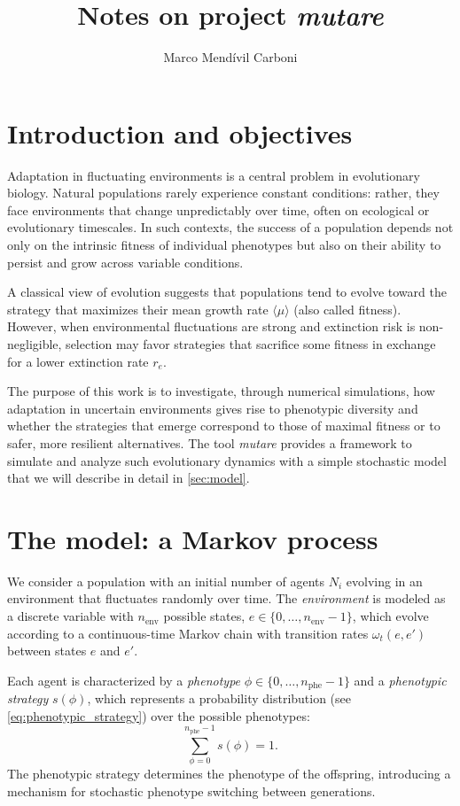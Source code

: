 \documentclass[a4paper,10pt,twocolumn]{article}
\title{Notes on project \emph{mutare}}
\author{Marco Mendívil Carboni}
\begin{document}
\maketitle

\section{Introduction and objectives} \label{sec:introduction}

Adaptation in fluctuating environments is a central problem in evolutionary biology. Natural populations rarely experience constant conditions: rather, they face environments that change unpredictably over time, often on ecological or evolutionary timescales. In such contexts, the success of a population depends not only on the intrinsic fitness of individual phenotypes but also on their ability to persist and grow across variable conditions.

A classical view of evolution suggests that populations tend to evolve toward the strategy that maximizes their mean growth rate $\langle\mu\rangle$ (also called fitness). However, when environmental fluctuations are strong and extinction risk is non-negligible, selection may favor strategies that sacrifice some fitness in exchange for a lower extinction rate $r_e$.

The purpose of this work is to investigate, through numerical simulations, how adaptation in uncertain environments gives rise to phenotypic diversity and whether the strategies that emerge correspond to those of maximal fitness or to safer, more resilient alternatives. The tool \emph{mutare} provides a framework to simulate and analyze such evolutionary dynamics with a simple stochastic model that we will describe in detail in \autoref{sec:model}.

\section{The model: a Markov process} \label{sec:model}

We consider a population with an initial number of agents $N_i$ evolving in an environment that fluctuates randomly over time. The \emph{environment} is modeled as a discrete variable with $n_{\text{env}}$ possible states, $e\in\{0,\dots,n_{\text{env}}-1\}$, which evolve according to a continuous-time Markov chain with transition rates $\omega_t(e,e')$ between states $e$ and $e'$.

Each agent is characterized by a \emph{phenotype} $\phi\in\{0,\dots,n_{\text{phe}}-1\}$ and a \emph{phenotypic strategy} $s(\phi)$, which represents a probability distribution (see \autoref{eq:phenotypic_strategy}) over the possible phenotypes:
\begin{equation} \label{eq:phenotypic_strategy}
    \sum_{\phi=0}^{n_{\text{phe}}-1}s(\phi) = 1.
\end{equation}
The phenotypic strategy determines the phenotype of the offspring, introducing a mechanism for stochastic phenotype switching between generations.
\end{document}
